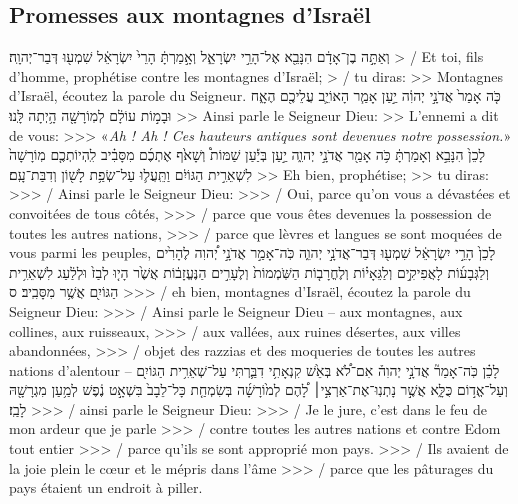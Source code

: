 \begin{paracol}[1]
  \subsection*{Promesses aux montagnes d'Israël}
  \verset
  {וְאַתָּ֣ה בֶן־אָדָ֔ם הִנָּבֵ֖א אֶל־הָרֵ֣י יִשְׂרָאֵ֑ל
    וְאָ֣מַרְתָּ֔
    הָרֵי֙ יִשְׂרָאֵ֔ל שִׁמְע֖וּ דְּבַר־יְהוָֽה׃}
  {> / Et toi, fils d’homme, prophétise contre les montagnes d’Israël;
    > / tu diras:
    >> Montagnes d’Israël, écoutez la parole du Seigneur.}
  \verset
  {כֹּ֤ה אָמַר֙ אֲדֹנָ֣י יְהוִ֔ה
    יַ֣עַן אָמַ֧ר הָאוֹיֵ֛ב עֲלֵיכֶ֖ם
    הֶאָ֑ח וּבָמ֣וֹת עוֹלָ֔ם לְמֽוֹרָשָׁ֖ה הָ֥יְתָה לָּֽנוּ׃}
  {>> Ainsi parle le Seigneur Dieu:
    >> L’ennemi a dit de vous:
    >>> «\textit{Ah ! Ah ! Ces hauteurs antiques sont devenues notre possession.}»}
  \verset
  {לָכֵן֙ הִנָּבֵ֣א
    וְאָמַרְתָּ֔
    כֹּ֥ה אָמַ֖ר אֲדֹנָ֣י יְהוִ֑ה
    יַ֣עַן בְּיַ֡עַן שַׁמּוֹת֩ וְשָׁאֹ֙ף אֶתְכֶ֜ם מִסָּבִ֗יב
    לִֽהְיוֹתְכֶ֤ם מֽוֹרָשָׁה֙ לִשְׁאֵרִ֣ית הַגּוֹיִ֔ם
    וַתֵּֽעֲל֛וּ עַל־שְׂפַ֥ת לָשׁ֖וֹן וְדִבַּת־עָֽם׃}
  {>> Eh bien, prophétise;
    >> tu diras:
    >>> / Ainsi parle le Seigneur Dieu:
    >>> / Oui, parce qu’on vous a dévastées et convoitées de tous côtés,
    >>> / parce que vous êtes devenues la possession de toutes les autres nations,
    >>> / parce que lèvres et langues se sont moquées de vous parmi les peuples,}
  \verset
  {לָכֵן֙ הָרֵ֣י יִשְׂרָאֵ֔ל שִׁמְע֖וּ דְּבַר־אֲדֹנָ֣י יְהוִ֑ה
    כֹּֽה־אָמַ֣ר אֲדֹנָ֣י יְ֠הוִה לֶהָרִ֙ים וְלַגְּבָע֜וֹת לָאֲפִיקִ֣ים
    וְלַגֵּאָי֗וֹת וְלֶחֳרָב֤וֹת הַשֹּֽׁמְמוֹת֙ וְלֶעָרִ֣ים הַנֶּעֱזָב֔וֹת
    אֲשֶׁ֙ר הָי֤וּ לְבַז֙ וּלְלַ֔עַג לִשְׁאֵרִ֥ית הַגּוֹיִ֖ם אֲשֶׁ֥ר מִסָּבִֽיב׃ ס}
  {>>> / eh bien, montagnes d’Israël, écoutez la parole du Seigneur Dieu:
    >>> / Ainsi parle le Seigneur Dieu – aux montagnes, aux collines, aux ruisseaux,
    >>> / aux vallées, aux ruines désertes, aux villes abandonnées,
    >>> / objet des razzias et des moqueries de toutes les autres nations d’alentour –}
  \verset
  {לָכֵ֗ן כֹּֽה־אָמַר֘ אֲדֹנָ֣י יְהוִה֒
    אִם־לֹ֠א בְּאֵ֙שׁ קִנְאָתִ֥י דִבַּ֛רְתִּי
    עַל־שְׁאֵרִ֥ית הַגּוֹיִ֖ם וְעַל־אֱד֣וֹם כֻּלָּ֑א
    אֲשֶׁ֣ר נָתְנֽוּ־אֶת־אַרְצִ֣י׀
    לָ֠הֶם לְמ֙וֹרָשָׁ֜ה בְּשִׂמְחַ֤ת כָּל־לֵבָב֙ בִּשְׁאָ֣ט נֶ֔פֶשׁ
    לְמַ֥עַן מִגְרָשָׁ֖הּ לָבַֽז׃}
  {>>> / ainsi parle le Seigneur Dieu:
    >>> / Je le jure, c’est dans le feu de mon ardeur que je parle
    >>> / contre toutes les autres nations et contre Edom tout entier
    >>> / parce qu’ils se sont approprié mon pays.
    >>> / Ils avaient de la joie plein le cœur et le mépris dans l’âme
    >>> / parce que les pâturages du pays étaient un endroit à piller.}

\end{paracol}
